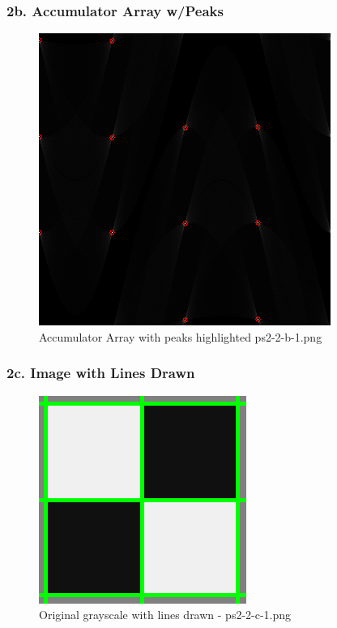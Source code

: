	\begin{frame}
		\frametitle{2b. Accumulator Array w/Peaks}
		
		\begin{figure}[!htb]
			\centering
			\includegraphics[height=0.65\textheight]{./output/ps2-2-b-1.png}
			\caption{Accumulator Array with peaks highlighted ps2-2-b-1.png} 
		\end{figure}	
		
	\end{frame}

	\begin{frame}
		\frametitle{2c. Image with Lines Drawn}
		
		\begin{figure}[!htb]
			\centering
			\includegraphics[height=0.65\textheight]{./output/ps2-2-c-1.png}
			\caption{Original grayscale with lines drawn - ps2-2-c-1.png} 
		\end{figure}	
		
	\end{frame}

